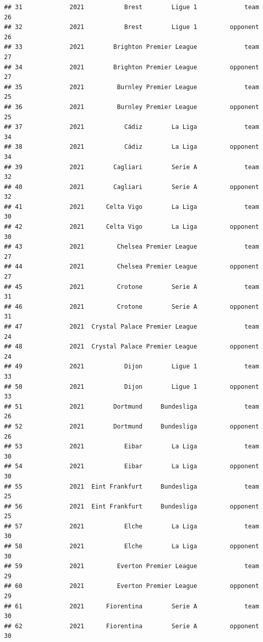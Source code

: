 \documentclass[
]{book}
\theoremstyle{definition}
\theoremstyle{definition}
\theoremstyle{definition}
\theoremstyle{definition}
\theoremstyle{remark}
\begin{document}
\begin{verbatim}
## 31             2021           Brest        Ligue 1             team          26
## 32             2021           Brest        Ligue 1         opponent          26
## 33             2021        Brighton Premier League             team          27
## 34             2021        Brighton Premier League         opponent          27
## 35             2021         Burnley Premier League             team          25
## 36             2021         Burnley Premier League         opponent          25
## 37             2021           Cádiz        La Liga             team          34
## 38             2021           Cádiz        La Liga         opponent          34
## 39             2021        Cagliari        Serie A             team          32
## 40             2021        Cagliari        Serie A         opponent          32
## 41             2021      Celta Vigo        La Liga             team          30
## 42             2021      Celta Vigo        La Liga         opponent          30
## 43             2021         Chelsea Premier League             team          27
## 44             2021         Chelsea Premier League         opponent          27
## 45             2021         Crotone        Serie A             team          31
## 46             2021         Crotone        Serie A         opponent          31
## 47             2021  Crystal Palace Premier League             team          24
## 48             2021  Crystal Palace Premier League         opponent          24
## 49             2021           Dijon        Ligue 1             team          33
## 50             2021           Dijon        Ligue 1         opponent          33
## 51             2021        Dortmund     Bundesliga             team          26
## 52             2021        Dortmund     Bundesliga         opponent          26
## 53             2021           Eibar        La Liga             team          30
## 54             2021           Eibar        La Liga         opponent          30
## 55             2021  Eint Frankfurt     Bundesliga             team          25
## 56             2021  Eint Frankfurt     Bundesliga         opponent          25
## 57             2021           Elche        La Liga             team          30
## 58             2021           Elche        La Liga         opponent          30
## 59             2021         Everton Premier League             team          29
## 60             2021         Everton Premier League         opponent          29
## 61             2021      Fiorentina        Serie A             team          30
## 62             2021      Fiorentina        Serie A         opponent          30

\end{verbatim}
\end{document}
